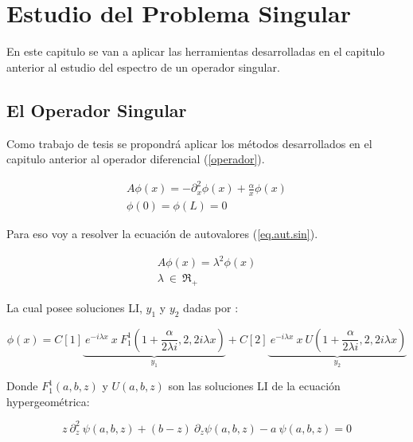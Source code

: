 \chapter{Estudio del Problema Singular}

En este capitulo se van a aplicar las herramientas desarrolladas en el capitulo anterior al estudio del espectro de un operador singular.

\section{El Operador Singular}

Como trabajo de tesis se propondrá aplicar los métodos desarrollados en el capitulo anterior al operador diferencial (\ref{operador}).

\begin{equation}
\begin{array}{c}
    A \phi (x) = - \partial ^2 _x  \phi(x) + \frac{\alpha}{x} \phi(x) \\
    \phi(0) = \phi(L) = 0 
\end{array}
\label{operador}
\end{equation}

Para eso voy a resolver la ecuación de autovalores (\ref{eq.aut.sin}).

\begin{equation}
\begin{array}{c}
    A  \phi (x)  =   \lambda ^2 \phi (x) \\ 
    \lambda \ \in \ \mathfrak{R} _+
\end{array}
\label{eq.aut.sin}
\end{equation}




La cual posee soluciones LI, $ y_1 $ y $ y_2 $ dadas por :

\begin{equation}
    \phi (x) = 
    C[1]
    \underbrace{
     \ e ^{-i \lambda x} \ x \ F _{1} ^{1} (1+\frac{ \alpha}{2 \lambda i },2,2 i \lambda x) } _ {y_1}
    + C[2] \underbrace{ \ e^{-i \lambda x } \ x \ U (1+\frac{ \alpha}{2 \lambda i },2,2 i \lambda x) } _{y_2} 
\label{eq.phi}
\end{equation}




Donde $F _1 ^1(a,b,z)$ y $ U(a,b,z)$ son las soluciones LI de la ecuación hypergeométrica:

\begin{equation}
    z \ \partial ^2 _z \ \psi (a,b,z) + (b-z) \
    \partial _z \psi (a,b,z)
    -a \ \psi (a,b,z) = 0
\end{equation}

